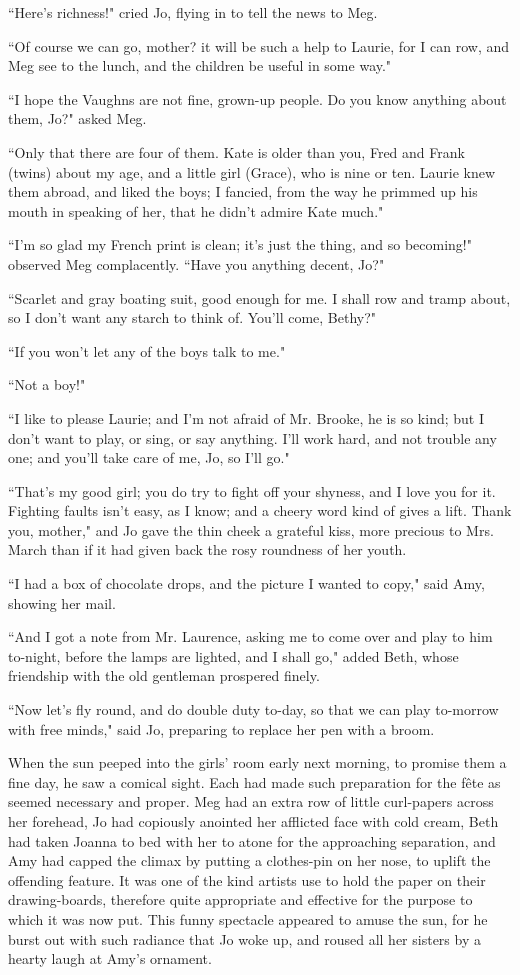 ``Here's richness!" cried Jo, flying in to tell the news
to Meg.

``Of course we can go, mother? it will be such a help to Laurie, for I
can row, and Meg see to the lunch, and the children be useful in some
way."

``I hope the Vaughns are not fine, grown-up people. Do you know anything
about them, Jo?" asked Meg.

``Only that there are four of them. Kate is older than you, Fred and
Frank (twins) about my age, and a little girl (Grace), who is nine or
ten. Laurie knew them abroad, and liked the boys; I fancied, from the
way he primmed up his mouth in speaking of her, that he
didn't admire Kate much."

``I'm so glad my French print is clean;
it's just the thing, and so becoming!" observed Meg
complacently. ``Have you anything decent, Jo?"

``Scarlet and gray boating suit, good enough for me. I shall row and
tramp about, so I don't want any starch to think of.
You'll come, Bethy?"

``If you won't let any of the boys talk to me."

``Not a boy!"

``I like to please Laurie; and I'm not afraid of Mr.
Brooke, he is so kind; but I don't want to play, or
sing, or say anything. I'll work hard, and not trouble
any one; and you'll take care of me, Jo, so
I'll go."

``That's my good girl; you do try to fight off your
shyness, and I love you for it. Fighting faults isn't
easy, as I know; and a cheery word kind of gives a lift. Thank you,
mother," and Jo gave the thin cheek a grateful kiss, more precious to
Mrs. March than if it had given back the rosy roundness of her youth.

``I had a box of chocolate drops, and the picture I wanted to copy," said
Amy, showing her mail.

``And I got a note from Mr. Laurence, asking me to come over and play to
him to-night, before the lamps are lighted, and I shall go," added Beth,
whose friendship with the old gentleman prospered finely.

``Now let's fly round, and do double duty to-day, so that
we can play to-morrow with free minds," said Jo, preparing to replace
her pen with a broom.

When the sun peeped into the girls' room early next
morning, to promise them a fine day, he saw a comical sight. Each had
made such preparation for the fête as seemed necessary and proper. Meg
had an extra row of little curl-papers across her forehead, Jo had
copiously anointed her afflicted face with cold cream, Beth had taken
Joanna to bed with her to atone for the approaching separation, and Amy
had capped the climax by putting a clothes-pin on her nose, to uplift
the offending feature. It was one of the kind artists use to hold the
paper on their drawing-boards, therefore quite appropriate and effective
for the purpose to which it was now put. This funny spectacle appeared
to amuse the sun, for he burst out with such radiance that Jo woke up,
and roused all her sisters by a hearty laugh at Amy's
ornament.


